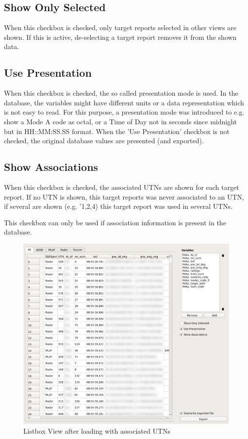 \subsection{Show Only Selected}
When this checkbox is checked, only target reports selected in other views are shown. If this is active, de-selecting a target report removes it from the shown data.

\subsection{Use Presentation}
When this checkbox is checked, the so called presentation mode is used. In the database, the variables might have different units or a data representation which is not easy to read. For this purpose, a presentation mode was introduced to e.g. show a Mode A code as octal, or a Time of Day not in seconds since midnight but in HH::MM:SS.SS format. When the 'Use Presentation' checkbox is not checked, the original database values are presented (and exported).

\subsection{Show Associations}
When this checkbox is checked, the associated UTNs are shown for each target report. If no UTN is shown, this target reports was never associated to an UTN, if several are shown (e.g. '1,2,4) this target report was used in several UTNs. 

This checkbox can only be used if association information is present in the database.

\begin{figure}[H]
    \hspace*{-2cm}
    \includegraphics[width=18cm,frame]{../screenshots/listbox_loaded_assoc.png}
  \caption{Listbox View after loading with associated UTNs}
  \label{fig:listbox_load}
\end{figure}


